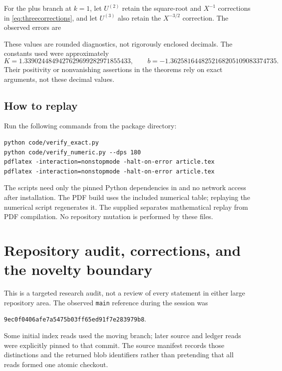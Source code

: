 \documentclass[11pt,a4paper]{article}
\numberwithin{equation}{section}
\theoremstyle{definition}\newtheorem{definition}[theorem]{Definition}
\theoremstyle{remark}\newtheorem{remark}[theorem]{Remark}
\begin{document}
For the plus branch at $k=1$, let $U^{(2)}$ retain the square-root and
$X^{-1}$ corrections in \eqref{eq:threecorrections}, and let $U^{(3)}$
also retain the $X^{-3/2}$ correction. The observed errors are
\begin{center}

\end{center}
These values are rounded diagnostics, not rigorously enclosed decimals.
The constants used were approximately
\[
 K=1.3390244849427629699282971855433,\qquad
 b=-1.3625816448252168205109083374735.
\]
Their positivity or nonvanishing assertions in the theorems rely on exact
arguments, not these decimal values.

\subsection{How to replay}
Run the following commands from the package directory:
\begin{verbatim}
python code/verify_exact.py
python code/verify_numeric.py --dps 180
pdflatex -interaction=nonstopmode -halt-on-error article.tex
pdflatex -interaction=nonstopmode -halt-on-error article.tex
\end{verbatim}
The scripts need only the pinned Python dependencies in
 and no network access after installation. The PDF
build uses the included numerical table; replaying the numerical script
regenerates it. The supplied  separates mathematical replay
from PDF compilation. No repository mutation is performed by these files.

\section{Repository audit, corrections, and the novelty boundary}
\label{sec:audit}
This is a targeted research audit, not a review of every statement in
either large repository area. The observed \texttt{main} reference during
the session was
\begin{center}\small
\texttt{9ec0f0406afe7a5475b03ff65ed91f7e283979b8}.
\end{center}
Some initial index reads used the moving branch; later source and ledger
reads were explicitly pinned to that commit. The source manifest records
those distinctions and the returned blob identifiers rather than
pretending that all reads formed one atomic checkout.
\end{document}
